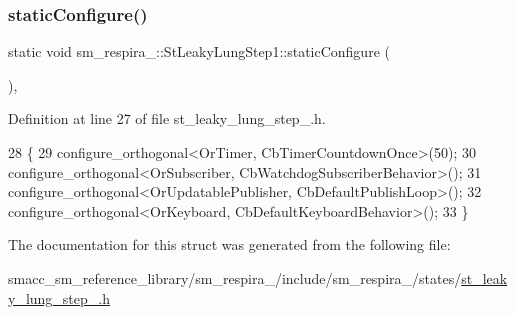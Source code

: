 \subsubsection{\texorpdfstring{static\+Configure()}{staticConfigure()}}
{\footnotesize\ttfamily static void sm\+\_\+respira\+\_\+::\+St\+Leaky\+Lung\+Step1\+::static\+Configure (\begin{DoxyParamCaption}{ }\end{DoxyParamCaption})\hspace{0.3cm}{\ttfamily [inline]}, {\ttfamily [static]}}



Definition at line 27 of file st\+\_\+leaky\+\_\+lung\+\_\+step\+\_.\+h.


\begin{DoxyCode}
28     \{
29         configure\_orthogonal<OrTimer, CbTimerCountdownOnce>(50);
30         configure\_orthogonal<OrSubscriber, CbWatchdogSubscriberBehavior>();
31         configure\_orthogonal<OrUpdatablePublisher, CbDefaultPublishLoop>();
32         configure\_orthogonal<OrKeyboard, CbDefaultKeyboardBehavior>();
33     \}
\end{DoxyCode}


The documentation for this struct was generated from the following file\+:\begin{DoxyCompactItemize}
\item 
smacc\+\_\+sm\+\_\+reference\+\_\+library/sm\+\_\+respira\+\_/include/sm\+\_\+respira\+\_/states/\hyperlink{st__leaky__lung__step__1_8h}{st\+\_\+leaky\+\_\+lung\+\_\+step\+\_.\+h}\end{DoxyCompactItemize}
